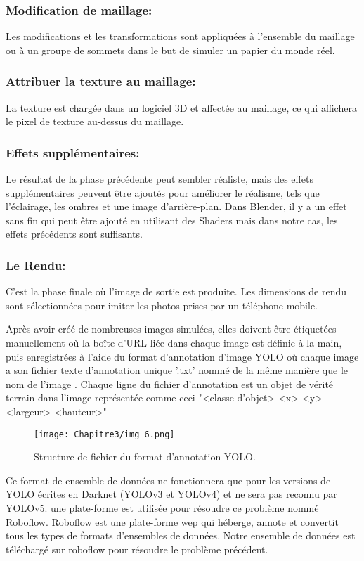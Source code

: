          \subsubsection{Modification de maillage:} Les modifications et les transformations sont appliquées à l'ensemble du maillage ou à un groupe de sommets dans le but de simuler un papier du monde réel. 
          \subsubsection{Attribuer la texture au maillage:} La texture est chargée dans un logiciel 3D et affectée au maillage, ce qui affichera le pixel de texture au-dessus du maillage.
          \subsubsection{Effets supplémentaires:} Le résultat de la phase précédente peut sembler réaliste, mais des effets supplémentaires peuvent être ajoutés pour améliorer le réalisme, tels que l'éclairage, les ombres et une image d'arrière-plan. Dans Blender, il y a un effet sans fin qui peut être ajouté en utilisant des Shaders mais dans notre cas, les effets précédents sont suffisants.
          \subsubsection{Le Rendu:} C'est la phase finale où l'image de sortie est produite. Les dimensions de rendu sont sélectionnées pour imiter les photos prises par un téléphone mobile.
          

          Après avoir créé de nombreuses images simulées, elles doivent être étiquetées manuellement où la boîte d'URL liée dans chaque image est définie à la main, puis enregistrées à l'aide du format d'annotation d'image YOLO où chaque image a son fichier texte d'annotation unique '.txt' nommé de la même manière que le nom de l'image . Chaque ligne du fichier d'annotation est un objet de vérité terrain dans l'image représentée comme ceci "<classe d'objet> <x> <y> <largeur> <hauteur>"
          \begin{figure}[H]
               \centering
               \texttt{[image: Chapitre3/img\_6.png]}
               \caption{Structure de fichier du format d'annotation YOLO.}
               \label{img7}
               \end{figure}

          Ce format de ensemble de données ne fonctionnera que pour les versions de YOLO écrites en Darknet (YOLOv3 et YOLOv4) et ne sera pas reconnu par YOLOv5. une plate-forme est utilisée pour résoudre ce problème nommé Roboflow. Roboflow est une plate-forme wep qui héberge, annote et convertit tous les types de formats d'ensembles de données. Notre ensemble de données est téléchargé sur roboflow pour résoudre le problème précédent.

